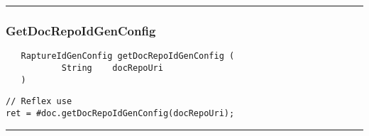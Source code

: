 \rule{15cm}{2pt}
\subsubsection{GetDocRepoIdGenConfig}
\label{Api:GetDocRepoIdGenConfig}
\begin{verbatim}
   RaptureIdGenConfig getDocRepoIdGenConfig (
           String    docRepoUri
   )
\end{verbatim}
\begin{lstlisting}[language=reflex]
// Reflex use
ret = #doc.getDocRepoIdGenConfig(docRepoUri);
\end{lstlisting}



\rule{15cm}{2pt}
